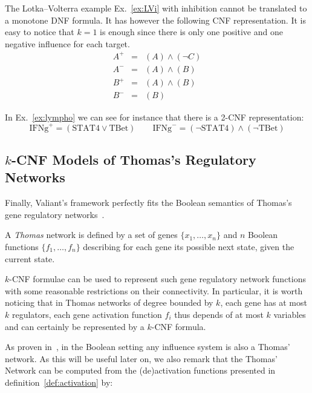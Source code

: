 \documentclass{llncs}
\begin{document}
\begin{example}
   The Lotka--Volterra example Ex.~\ref{ex:LVi} with inhibition cannot be
   translated to a monotone DNF formula. It has however the following CNF
   representation. It is easy to
   notice that $k=1$ is enough since there is only one positive and one
   negative influence for each target.
\begin{eqnarray*}
   A^+&=&(A)\wedge(\neg C)\\
A^-&=&(A) \wedge (B)\\
B^+&=&(A)\wedge (B)\\
   B^-&=&(B)
\end{eqnarray*}

\end{example}

\begin{example}
   In Ex.~\ref{ex:lympho} we can see for instance that there is a 2-CNF
   representation:
   \[\text{IFNg}^+=(\text{STAT4}\vee \text{TBet})\qquad
   \text{IFNg}^-=(\neg \text{STAT4})\wedge(\neg \text{TBet})\]
\end{example}

\subsection{$k$-CNF Models of Thomas's Regulatory Networks}

Finally, Valiant's framework perfectly fits the Boolean semantics of Thomas's gene
regulatory networks~\cite{Thomas73jtb}.

\begin{definition}
   A \emph{Thomas} network is defined by a set of genes $\{x_1,\dots,x_n\}$
   and $n$ Boolean functions $\{f_1,\dots,f_n\}$ describing for each gene its
   possible next state, given the current state.
\end{definition}

$k$-CNF formulae can be used to represent such gene regulatory network functions with some reasonable restrictions on their connectivity.
In particular, it is worth noticing that in Thomas networks of degree bounded by $k$,
each gene has at most $k$ regulators, each gene activation function $f_i$ thus depends of at most $k$ variables
and can certainly be represented by a $k$-CNF formula.

As proven in~\cite{FMRS16cmsb}, in the Boolean setting any influence system is
also a Thomas' network.
As this will be useful later on, we also remark that the Thomas' Network can be computed from the (de)activation functions presented in definition~\ref{def:activation} by:
\end{document}
